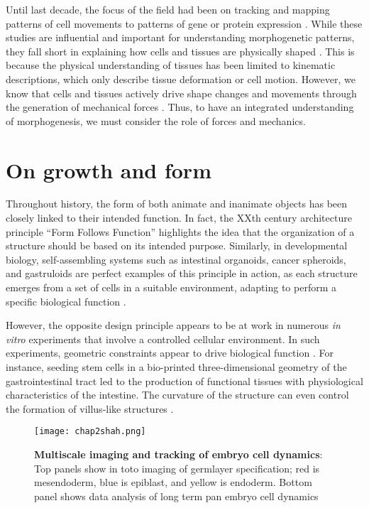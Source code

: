 Until last decade, the focus of the field had been on tracking and mapping patterns of cell movements to patterns of gene or protein expression \cite{gorfinkiel2021}. While these studies are influential and important for understanding morphogenetic patterns, they fall short in explaining how cells and tissues are physically shaped \cite{veenvliet2021, odell1981}. This is because the physical understanding of tissues has been limited to kinematic descriptions, which only describe tissue deformation or cell motion. However, we know that cells and tissues actively drive shape changes and movements through the generation of mechanical forces \cite{lecuit2011}. Thus, to have an integrated understanding of morphogenesis, we must consider the role of forces and mechanics.

\hypertarget{on-growth-and-form}{%
\section{On growth and form}\label{on-growth-and-form}}

Throughout history, the form of both animate and inanimate objects has been closely linked to their intended function. In fact, the XXth century architecture principle ``Form Follows Function'' highlights the idea that the organization of a structure should be based on its intended purpose. Similarly, in developmental biology, self-assembling systems such as intestinal organoids, cancer spheroids, and gastruloids are perfect examples of this principle in action, as each structure emerges from a set of cells in a suitable environment, adapting to perform a specific biological function \cite{gjorevski2016, ishiguro2017, morizane2017, vianello2019}.

However, the opposite design principle appears to be at work in numerous \textit{in vitro} experiments that involve a controlled cellular environment. In such experiments, geometric constraints appear to drive biological function \cite{xi2018}. For instance, seeding stem cells in a bio-printed three-dimensional geometry of the gastrointestinal tract led to the production of functional tissues with physiological characteristics of
the intestine. The curvature of the structure can even control the formation of villus-like structures \cite{brassard2021}. 

\begin{figure}[h!]
	\centering
	\texttt{[image: chap2shah.png]}
	\caption{\label{fig_2_1} \textbf{Multiscale imaging and tracking of embryo cell dynamics}: Top panels show in toto imaging of germlayer specification; red is mesendoderm, blue is epiblast, and yellow is endoderm. Bottom panel shows data analysis of long term pan embryo cell dynamics \cite{shah2019}}
\end{figure}

